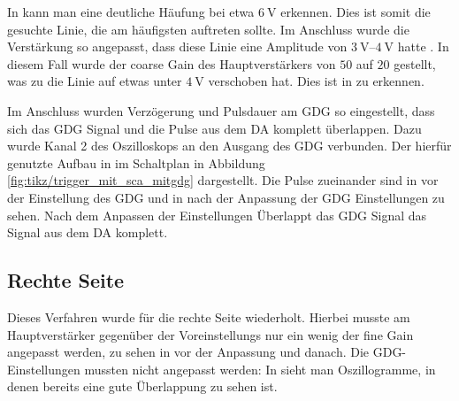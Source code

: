 In  kann man eine deutliche Häufung bei etwa $\SI{6}{\volt}$ erkennen. Dies ist somit die gesuchte Linie, die am häufigsten auftreten sollte. Im Anschluss wurde die Verstärkung so angepasst, dass diese Linie eine Amplitude von $\SIrange{3}{4}{\volt}$ hatte \cite[4]{525va}. In diesem Fall wurde der coarse Gain des Hauptverstärkers von $50$ auf $20$ gestellt, was zu die Linie auf etwas unter $\SI{4}{\volt}$ verschoben hat. Dies ist in  zu erkennen.


Im Anschluss wurden Verzögerung und Pulsdauer am GDG so eingestellt, dass sich das GDG Signal und die Pulse aus dem DA komplett überlappen. Dazu wurde Kanal 2 des Oszilloskops an den Ausgang des GDG verbunden. Der hierfür genutzte Aufbau in im Schaltplan in Abbildung \ref{fig:tikz/trigger_mit_sca_mitgdg} dargestellt. Die Pulse zueinander sind in  vor der Einstellung des GDG und in  nach der Anpassung der GDG Einstellungen zu sehen. Nach dem Anpassen der Einstellungen Überlappt das GDG Signal das Signal aus dem DA komplett.




\subsection*{Rechte Seite}
Dieses Verfahren wurde für die rechte Seite wiederholt. Hierbei musste am Hauptverstärker gegenüber der Voreinstellungs nur ein wenig der fine Gain angepasst werden, zu sehen in  vor der Anpassung und  danach. Die GDG-Einstellungen mussten nicht angepasst werden: In  sieht man Oszillogramme, in denen bereits eine gute Überlappung zu sehen ist.




